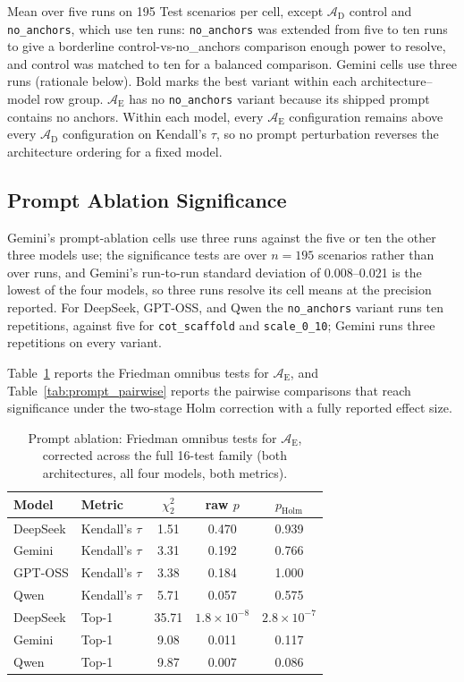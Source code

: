 \documentclass[11pt]{article}
\begin{document}
Mean over five runs on 195 Test scenarios per cell, except $\mathcal{A}_{\text{D}}$ control and \texttt{no\_anchors}, which use ten runs: \texttt{no\_anchors} was extended from five to ten runs to give a borderline control-vs-no\_anchors comparison enough power to resolve, and control was matched to ten for a balanced comparison. Gemini cells use three runs (rationale below). Bold marks the best variant within each architecture--model row group. $\mathcal{A}_{\text{E}}$ has no \texttt{no\_anchors} variant because its shipped prompt contains no anchors. Within each model, every $\mathcal{A}_{\text{E}}$ configuration remains above every $\mathcal{A}_{\text{D}}$ configuration on Kendall's $\tau$, so no prompt perturbation reverses the architecture ordering for a fixed model.

\subsection{Prompt Ablation Significance}
\label{app:prompt-ablation-significance}

Gemini's prompt-ablation cells use three runs against the five or ten the other three models use; the significance tests are over $n=195$ scenarios rather than over runs, and Gemini's run-to-run standard deviation of 0.008--0.021 is the lowest of the four models, so three runs resolve its cell means at the precision reported. For DeepSeek, GPT-OSS, and Qwen the \texttt{no\_anchors} variant runs ten repetitions, against five for \texttt{cot\_scaffold} and \texttt{scale\_0\_10}; Gemini runs three repetitions on every variant.

Table~\ref{tab:prompt_friedman} reports the Friedman omnibus tests for $\mathcal{A}_{\text{E}}$, and Table~\ref{tab:prompt_pairwise} reports the pairwise comparisons that reach significance under the two-stage Holm correction with a fully reported effect size.

\begin{table}[htbp]
\centering
\small
\centering
\renewcommand{\arraystretch}{1.10}
\caption{Prompt ablation: Friedman omnibus tests for $\mathcal{A}_{\text{E}}$, corrected across the full 16-test family (both architectures, all four models, both metrics).}
\label{tab:prompt_friedman}
\begin{tabular}{@{}ll ccc@{}}
\toprule
Model & Metric & $\chi^2_2$ & raw $p$ & $p_{\text{Holm}}$ \\
\midrule
DeepSeek & Kendall's $\tau$ & 1.51 & 0.470 & 0.939 \\
Gemini & Kendall's $\tau$ & 3.31 & 0.192 & 0.766 \\
GPT-OSS & Kendall's $\tau$ & 3.38 & 0.184 & 1.000 \\
Qwen & Kendall's $\tau$ & 5.71 & 0.057 & 0.575 \\
DeepSeek & Top-1 & 35.71 & $1.8\times10^{-8}$ & $2.8\times10^{-7}$ \\
Gemini & Top-1 & 9.08 & 0.011 & 0.117 \\
Qwen & Top-1 & 9.87 & 0.007 & 0.086 \\
\bottomrule
\end{tabular}
\renewcommand{\arraystretch}{1.0}
\end{table}
\end{document}
